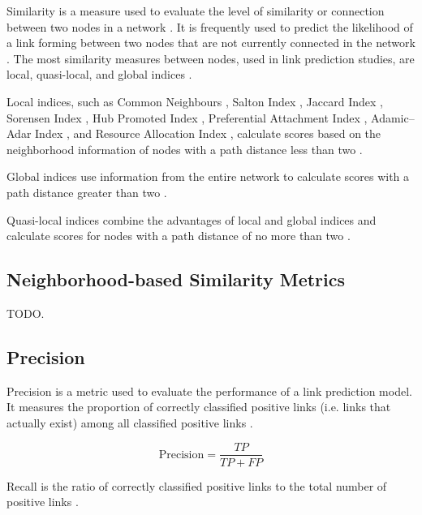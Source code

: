 Similarity is a measure used to evaluate the level of similarity or connection between two nodes in a network \cite{arrar2023comprehensive}. It is frequently used to predict the likelihood of a link forming between two nodes that are not currently connected in the network \cite{arrar2023comprehensive}. The most similarity measures between nodes, used in link prediction studies, are local, quasi-local, and global indices \cite{arrar2023comprehensive}.

Local indices, such as Common Neighbours \cite{newman2001clustering}, Salton Index \cite{salton1973specification}, Jaccard Index \cite{jaccard1901etude}, Sorensen Index \cite{sorensen1948method}, Hub Promoted Index \cite{liben2003link}, Preferential Attachment Index \cite{barabasi1999emergence}, Adamic–Adar Index \cite{adamic2003friends}, and Resource Allocation Index \cite{zhou2010solving}, calculate scores based on the neighborhood information of nodes with a path distance less than two \cite{arrar2023comprehensive}.

Global indices use information from the entire network to calculate scores with a path distance greater than two \cite{arrar2023comprehensive}.

Quasi-local indices combine the advantages of local and global indices and calculate scores for nodes with a path distance of no more than two \cite{arrar2023comprehensive}.



\subsection{Neighborhood-based Similarity Metrics}

TODO.


\subsection{Precision}

Precision is a metric used to evaluate the performance of a link prediction model. It measures the proportion of correctly classified positive links (i.e. links that actually exist) among all classified positive links \cite{arrar2023comprehensive}.

\begin{equation}
\label{eq:precision}
  \text{Precision} = \frac{TP}{TP + FP}
\end{equation}

Recall is the ratio of correctly classified positive links to the total number of positive links \cite{arrar2023comprehensive}.

